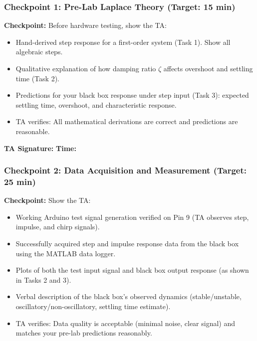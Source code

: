 \documentclass[11pt,letterpaper]{article}
\providecommand{\cpECE}[1]{\textcolor{OliveGreen}{\textbf{Checkpoint:} #1}}
\begin{document}
\vspace{0.5cm}

\subsubsection*{Checkpoint 1: Pre-Lab Laplace Theory (Target: 15 min)}

\cpECE{Before hardware testing, show the TA:}
\begin{itemize}
    \item[$\square$] Hand-derived step response for a first-order system (Task 1). Show all algebraic steps.
    \item[$\square$] Qualitative explanation of how damping ratio $\zeta$ affects overshoot and settling time (Task 2).
    \item[$\square$] Predictions for your black box response under step input (Task 3): expected settling time, overshoot, and characteristic response.
    \item[$\square$] TA verifies: All mathematical derivations are correct and predictions are reasonable.
\end{itemize}

\vspace{0.3cm}
\textbf{TA Signature:} \underline{\hspace{2.5cm}} \quad \textbf{Time:} \underline{\hspace{1.5cm}}

\vspace{0.5cm}

\subsubsection*{Checkpoint 2: Data Acquisition and Measurement (Target: 25 min)}

\cpECE{Show the TA:}
\begin{itemize}
    \item[$\square$] Working Arduino test signal generation verified on Pin 9 (TA observes step, impulse, and chirp signals).
    \item[$\square$] Successfully acquired step and impulse response data from the black box using the MATLAB data logger.
    \item[$\square$] Plots of both the test input signal and black box output response (as shown in Tasks 2 and 3).
    \item[$\square$] Verbal description of the black box's observed dynamics (stable/unstable, oscillatory/non-oscillatory, settling time estimate).
    \item[$\square$] TA verifies: Data quality is acceptable (minimal noise, clear signal) and matches your pre-lab predictions reasonably.
\end{itemize}
\end{document}
